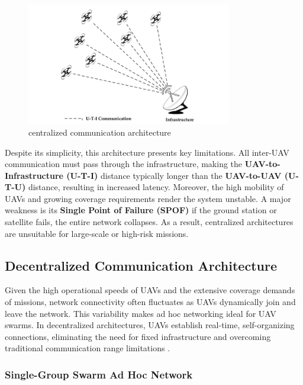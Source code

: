 \begin{figure}[H]
\centering
\includegraphics[width=0.8\textwidth]{Figures/Chapter1/Section5/1.png}
\caption{centralized communication architecture \cite{Chen2020}}
\label{fig:centralized communication architecture}
\end{figure}

Despite its simplicity, this architecture presents key limitations. All inter-UAV communication must pass through the infrastructure, making the \textbf{UAV-to-Infrastructure (U-T-I)} distance typically longer than the \textbf{UAV-to-UAV (U-T-U)} distance, resulting in increased latency. Moreover, the high mobility of UAVs and growing coverage requirements render the system unstable. A major weakness is its \textbf{Single Point of Failure (SPOF)} if the ground station or satellite fails, the entire network collapses. As a result, centralized architectures are unsuitable for large-scale or high-risk missions.





\subsection{Decentralized Communication Architecture}

Given the high operational speeds of UAVs and the extensive coverage demands of missions, network connectivity often fluctuates as UAVs dynamically join and leave the network. This variability makes ad hoc networking ideal for UAV swarms. In decentralized architectures, UAVs establish real-time, self-organizing connections, eliminating the need for fixed infrastructure and overcoming traditional communication range limitations \cite{Chen2020}.



\subsubsection{Single-Group Swarm Ad Hoc Network}

